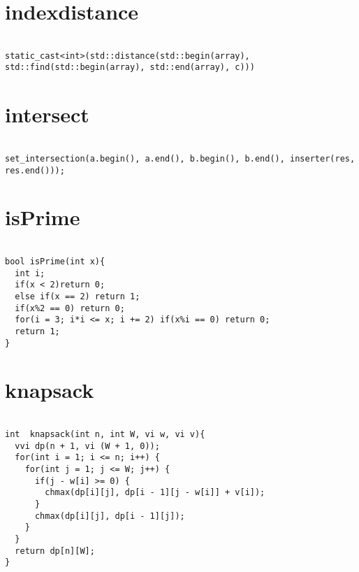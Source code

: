 \documentclass[a4j,titlepage]{jarticle} %
\begin{document}
\color{white}
\section{indexdistance}
\color{black}
\begin{lstlisting}[caption=indexdistance]

static_cast<int>(std::distance(std::begin(array), std::find(std::begin(array), std::end(array), c)))

\end{lstlisting}

\color{white}
\section{intersect}
\color{black}
\begin{lstlisting}[caption=intersect]

set_intersection(a.begin(), a.end(), b.begin(), b.end(), inserter(res, res.end()));

\end{lstlisting}

\color{white}
\section{isPrime}
\color{black}
\begin{lstlisting}[caption=isPrime]

bool isPrime(int x){
  int i;
  if(x < 2)return 0;
  else if(x == 2) return 1;
  if(x%2 == 0) return 0;
  for(i = 3; i*i <= x; i += 2) if(x%i == 0) return 0;
  return 1;
}

\end{lstlisting}

\color{white}
\section{knapsack}
\color{black}
\begin{lstlisting}[caption=knapsack]

int  knapsack(int n, int W, vi w, vi v){
  vvi dp(n + 1, vi (W + 1, 0));
  for(int i = 1; i <= n; i++) {
    for(int j = 1; j <= W; j++) {
      if(j - w[i] >= 0) {
        chmax(dp[i][j], dp[i - 1][j - w[i]] + v[i]);
      }
      chmax(dp[i][j], dp[i - 1][j]);
    }
  }
  return dp[n][W];
}

\end{lstlisting}

\color{white}
\end{document}

